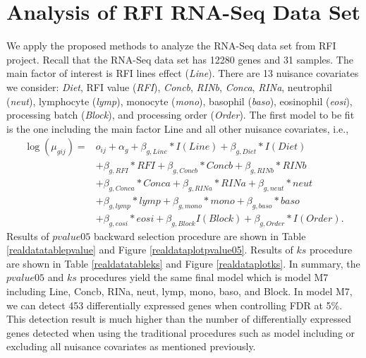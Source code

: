 \documentclass[12pt, letter]{article}\usepackage[]{graphicx}\usepackage[]{color}
\begin{document}
\section{ Analysis of RFI RNA-Seq Data Set}
We apply the proposed methods to analyze the RNA-Seq data set from RFI project. Recall that the RNA-Seq data set has 12280 genes and 31 samples. The main factor of interest is RFI lines effect (\emph{Line}). There are 13 nuisance covariates we consider: \emph{Diet}, RFI value (\emph{RFI}), \emph{Concb}, \emph{RINb}, \emph{Conca}, \emph{RINa}, neutrophil (\emph{neut}), lymphocyte (\emph{lymp}), monocyte (\emph{mono}), basophil (\emph{baso}), eosinophil (\emph{eosi}), processing batch (\emph{Block}), and processing order (\emph{Order}). The first model to be fit is the one including the main factor Line and all other nuisance covariates, i.e., 
\begin{align*}
\log(\mu_{gij}) = & o_{ij} +\alpha_g + \beta_{g,Line}*I(Line) + \beta_{g,Diet}*I(Diet)\\
     & + \beta_{g,RFI}*RFI + \beta_{g,Concb}*Concb + \beta_{g,RINb}*RINb \\
     & + \beta_{g,Conca}*Conca + \beta_{g,RINa}*RINa + \beta_{g,neut}*neut \\
     & + \beta_{g,lymp}*lymp + \beta_{g,mono}*mono + \beta_{g,baso}*baso\\
     & + \beta_{g,eosi}*eosi + \beta_{g,Block}I(Block) + \beta_{g,Order}*I(Order).
\end{align*}
Results of $pvalue05$ backward selection procedure are shown in Table \ref{realdatatablepvalue} and Figure \ref{realdataplotpvalue05}.  Results of $ks$ procedure are shown in  Table \ref{realdatatableks} and Figure \ref{realdataplotks}. In summary, the $pvalue05$ and $ks$ procedures yield the same final model which is model M7 including Line, Concb, RINa, neut, lymp, mono, baso, and Block. In model M7, we can detect 453 differentially expressed genes when controlling FDR at 5\%.  This detection result is much higher than the number of differentially expressed genes detected when using the traditional procedures such as model including or excluding all nuisance covariates as mentioned previously. 
\end{document}
